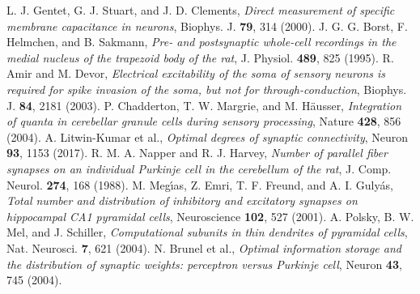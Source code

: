  L. J. Gentet, G. J. Stuart, and J. D. Clements, \emph{Direct measurement of specific membrane capacitance in neurons}, Biophys. J. \textbf{79}, 314 (2000).
 J. G. G. Borst, F. Helmchen, and B. Sakmann, \emph{Pre- and postsynaptic whole-cell recordings in the medial nucleus of the trapezoid body of the rat}, J. Physiol. \textbf{489}, 825 (1995).
 R. Amir and M. Devor, \emph{Electrical excitability of the soma of sensory neurons is required for spike invasion of the soma, but not for through-conduction}, Biophys. J. \textbf{84}, 2181 (2003).
 P. Chadderton, T. W. Margrie, and M. H\"ausser, \emph{Integration of quanta in cerebellar granule cells during sensory processing}, Nature \textbf{428}, 856 (2004).
 A. Litwin-Kumar et al., \emph{Optimal degrees of synaptic connectivity}, Neuron \textbf{93}, 1153 (2017).
 R. M. A. Napper and R. J. Harvey, \emph{Number of parallel fiber synapses on an individual Purkinje cell in the cerebellum of the rat}, J. Comp. Neurol. \textbf{274}, 168 (1988).
 M. Meg\'{\i}as, Z. Emri, T. F. Freund, and A. I. Guly\'as, \emph{Total number and distribution of inhibitory and excitatory synapses on hippocampal CA1 pyramidal cells}, Neuroscience \textbf{102}, 527 (2001).
 A. Polsky, B. W. Mel, and J. Schiller, \emph{Computational subunits in thin dendrites of pyramidal cells}, Nat. Neurosci. \textbf{7}, 621 (2004).
 N. Brunel et al., \emph{Optimal information storage and the distribution of synaptic weights: perceptron versus Purkinje cell}, Neuron \textbf{43}, 745 (2004).
